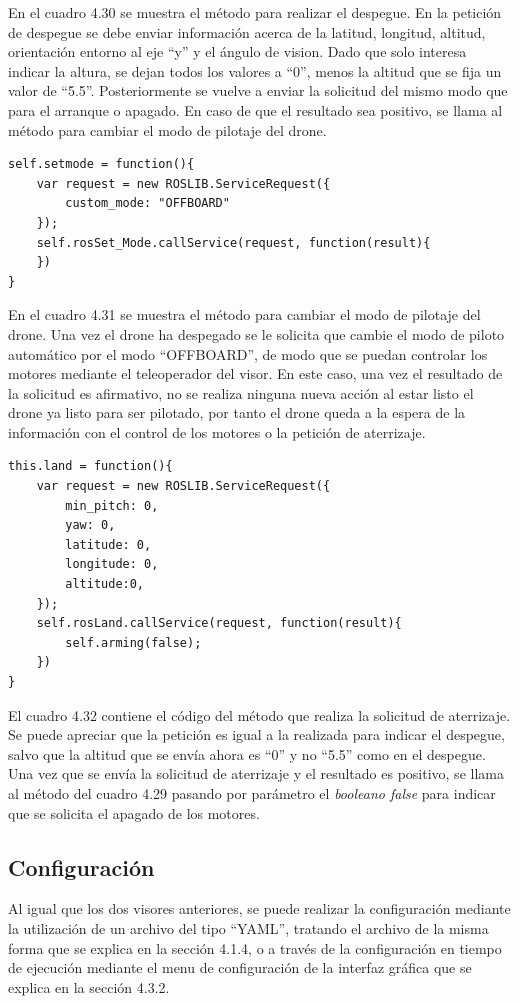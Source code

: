 En el cuadro 4.30 se muestra el método para realizar el despegue. En la petición de despegue se debe enviar información acerca de la latitud, longitud, altitud, orientación entorno al eje ``y'' y el ángulo de vision. Dado que solo interesa indicar la altura, se dejan todos los valores a ``0'', menos la altitud que se fija un valor de ``5.5''. Posteriormente se vuelve a enviar la solicitud del mismo modo que para el arranque o apagado. En caso de que el resultado sea positivo, se llama al método para cambiar el modo de pilotaje del drone.

\begin{lstlisting}[caption= Método para cambiar el modo de pilotaje, label=cod.setMode]
self.setmode = function(){
	var request = new ROSLIB.ServiceRequest({
		custom_mode: "OFFBOARD"
	});
	self.rosSet_Mode.callService(request, function(result){
	})
}
\end{lstlisting}

En el cuadro 4.31 se muestra el método para cambiar el modo de pilotaje del drone. Una vez el drone ha despegado se le solicita que cambie el modo de piloto automático por el modo ``OFFBOARD'', de modo que se puedan controlar los motores mediante el teleoperador del visor. En este caso, una vez el resultado de la solicitud es afirmativo, no se realiza ninguna nueva acción al estar listo el drone ya listo para ser pilotado, por tanto el drone queda a la espera de la información con el control de los motores o la petición de aterrizaje.

\begin{lstlisting}[caption= Método para cambiar el modo de pilotaje, label=cod.setMode]
this.land = function(){
	var request = new ROSLIB.ServiceRequest({
		min_pitch: 0,
		yaw: 0,
		latitude: 0,
		longitude: 0,
		altitude:0,
	});
	self.rosLand.callService(request, function(result){
		self.arming(false);
	})
}
\end{lstlisting}

El cuadro 4.32 contiene el código del método que realiza la solicitud de aterrizaje. Se puede apreciar que la petición es igual a la realizada para indicar el despegue, salvo que la altitud que se envía ahora es ``0'' y no ``5.5'' como en el despegue. Una vez que se envía la solicitud de aterrizaje y el resultado es positivo, se llama al método del cuadro 4.29 pasando por parámetro el \textit{booleano false} para indicar que se solicita el apagado de los motores.

\subsection{Configuración}
Al igual que los dos visores anteriores, se puede realizar la configuración mediante la utilización de un archivo del tipo ``YAML'', tratando el archivo de la misma forma que se explica en la sección 4.1.4,  o a través de la configuración en tiempo de ejecución mediante el menu de configuración de la interfaz gráfica que se explica en la sección 4.3.2.

